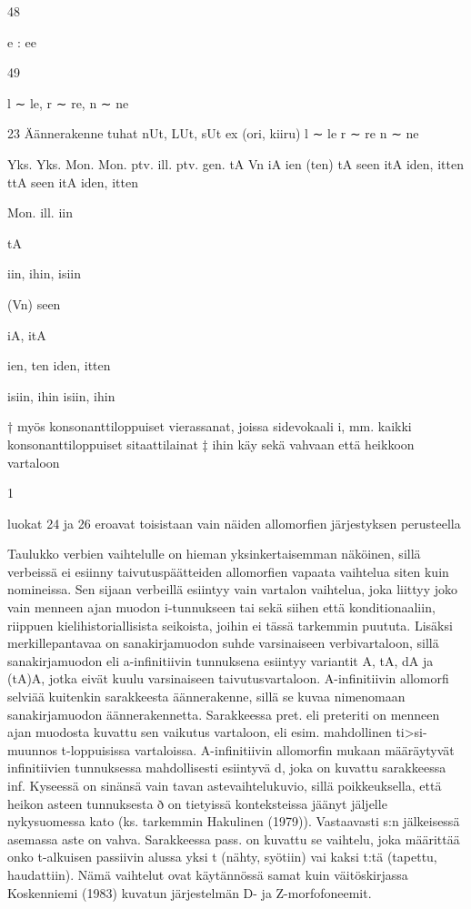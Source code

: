 \documentclass[free]{flammie}
\begin{document}
\begin{table}
48

e : ee

49

l ∼ le,
r ∼ re,
n ∼ ne

23
Äännerakenne
tuhat
nUt, LUt,
sUt
ex
(ori,
kiiru)
l ∼ le
r ∼ re
n ∼ ne

Yks. Yks. Mon. Mon.
ptv. ill.
ptv.
gen.
tA
Vn
iA
ien
(ten)
tA
seen itA
iden,
itten
ttA
seen itA
iden,
itten

Mon.
ill.
iin

tA

iin,
ihin,
isiin

(Vn)
seen

iA,
itA

ien, ten
iden,
itten

isiin,
ihin
isiin,
ihin

† myös konsonanttiloppuiset vierassanat, joissa sidevokaali i, mm. kaikki
konsonanttiloppuiset sitaattilainat
‡ ihin käy sekä vahvaan että heikkoon vartaloon

1

luokat 24 ja 26 eroavat toisistaan vain näiden allomorfien järjestyksen perusteella
\end{table}

Taulukko verbien vaihtelulle on hieman yksinkertaisemman näköinen, sillä verbeissä ei esiinny taivutuspäätteiden allomorfien vapaata vaihtelua siten kuin nomineissa. Sen sijaan verbeillä esiintyy vain vartalon vaihtelua, joka liittyy joko
vain menneen ajan muodon i-tunnukseen tai sekä siihen että konditionaaliin, riippuen kielihistoriallisista seikoista, joihin ei tässä tarkemmin puututa. Lisäksi merkillepantavaa on sanakirjamuodon suhde varsinaiseen verbivartaloon, sillä sanakirjamuodon eli a-infinitiivin tunnuksena esiintyy variantit A, tA, dA ja (tA)A, jotka eivät kuulu varsinaiseen taivutusvartaloon. A-infinitiivin allomorfi selviää kuitenkin sarakkeesta äännerakenne, sillä se kuvaa nimenomaan sanakirjamuodon
äännerakennetta. Sarakkeessa pret. eli preteriti on menneen ajan muodosta kuvattu sen vaikutus vartaloon, eli esim. mahdollinen ti>si-muunnos t-loppuisissa
vartaloissa. A-infinitiivin allomorfin mukaan määräytyvät infinitiivien tunnuksessa mahdollisesti esiintyvä d, joka on kuvattu sarakkeessa inf. Kyseessä on sinänsä
vain tavan astevaihtelukuvio, sillä poikkeuksella, että heikon asteen tunnuksesta
ð on tietyissä konteksteissa jäänyt jäljelle nykysuomessa kato (ks. tarkemmin Hakulinen (1979)). Vastaavasti s:n jälkeisessä asemassa aste on vahva. Sarakkeessa
pass. on kuvattu se vaihtelu, joka määrittää onko t-alkuisen passiivin alussa yksi
t (nähty, syötiin) vai kaksi t:tä (tapettu, haudattiin). Nämä vaihtelut ovat käytännössä samat kuin väitöskirjassa Koskenniemi (1983) kuvatun järjestelmän D- ja
Z-morfofoneemit.
\end{document}
